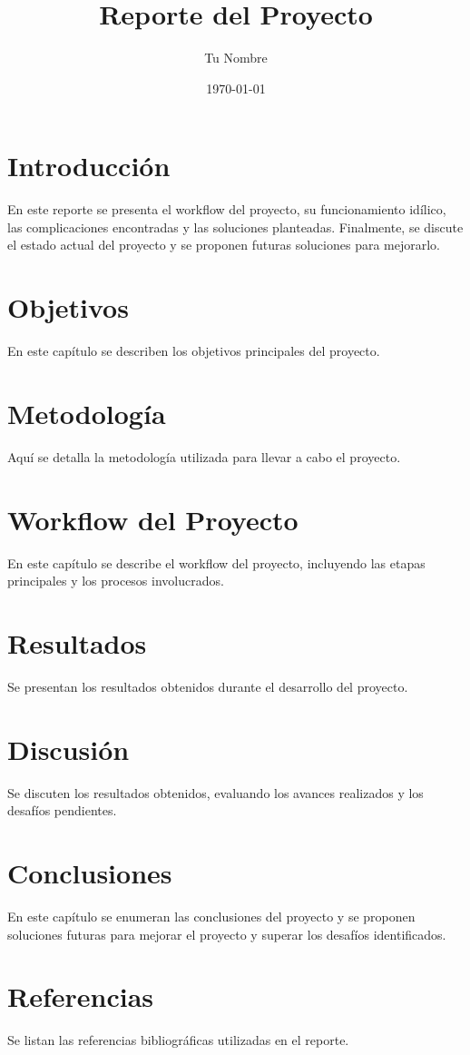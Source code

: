 \documentclass[a4paper,12pt]{report}
\title{Reporte del Proyecto}
\author{Tu Nombre}
\date{\today}
\begin{document}
\maketitle

\tableofcontents

\chapter{Introducción}
\label{chap:introduccion}
En este reporte se presenta el workflow del proyecto, su funcionamiento idílico, las complicaciones encontradas y las soluciones planteadas. Finalmente, se discute el estado actual del proyecto y se proponen futuras soluciones para mejorarlo.

\chapter{Objetivos}
\label{chap:objetivos}
En este capítulo se describen los objetivos principales del proyecto.

\chapter{Metodología}
\label{chap:metodologia}
Aquí se detalla la metodología utilizada para llevar a cabo el proyecto.

\chapter{Workflow del Proyecto}
\label{chap:workflow}
En este capítulo se describe el workflow del proyecto, incluyendo las etapas principales y los procesos involucrados.

\chapter{Resultados}
\label{chap:resultados}
Se presentan los resultados obtenidos durante el desarrollo del proyecto.

\chapter{Discusión}
\label{chap:discusion}
Se discuten los resultados obtenidos, evaluando los avances realizados y los desafíos pendientes.

\chapter{Conclusiones}
\label{chap:conclusiones}
En este capítulo se enumeran las conclusiones del proyecto y se proponen soluciones futuras para mejorar el proyecto y superar los desafíos identificados.

\chapter{Referencias}
\label{chap:referencias}
Se listan las referencias bibliográficas utilizadas en el reporte.
\end{document}
